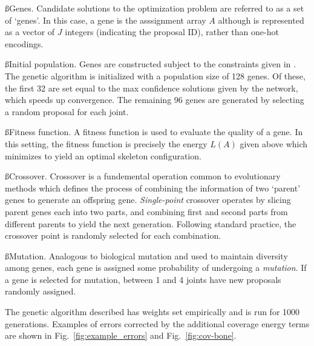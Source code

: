 \ss{Genes.} Candidate solutions to the optimization problem are referred to as a set of `genes'. In this case, a gene is the asssignment array $A$ although is represented as a vector of $J$ integers (indicating the proposal ID), rather than one-hot encodings. 

\ss{Initial population.} Genes are constructed subject to the constraints given in . The genetic algorithm is initialized with a population size of 128 genes. Of these, the first 32 are set equal to the max confidence solutions given by the network, which speeds up convergence. The remaining 96 genes are generated by selecting a random proposal for each joint. 

\ss{Fitness function.} A fitness function is used to evaluate the quality of a gene. In this setting, the fitness function is precisely the energy $L(A)$ given above which minimizes to yield an optimal skeleton configuration.

\ss{Crossover.} Crossover is a fundemental operation common to evolutionary methods which defines the process of combining the information of two `parent' genes to generate an offspring gene. \emph{Single-point} crossover operates by slicing parent genes each into two parts, and combining first and second parts from different parents to yield the next generation. Following standard practice, the crossover point is randomly selected for each combination. 

\ss{Mutation.} Analogous to biological mutation and used to maintain diversity among genes, each gene is assigned some probability of undergoing a {\em mutation}. If a gene 
is selected for mutation, between 1 and 4 joints have new proposals randomly assigned.

The genetic algorithm described has weights set empirically and is run for 1000 generations. Examples of errors corrected by the additional coverage energy terms are shown in Fig.~\ref{fig:example_errors} and Fig.~\ref{fig:cov-bone}.
